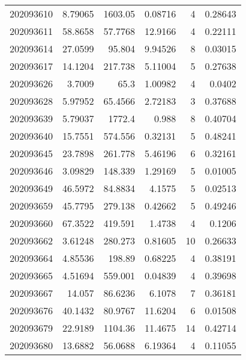 \begin{tabular}{rrrrrr}
 202093610 &          8.79065 &     1603.05   &            0.08716 &           4 & 0.28643 \\
 202093611 &         58.8658  &       57.7768 &           12.9166  &           4 & 0.22111 \\
 202093614 &         27.0599  &       95.804  &            9.94526 &           8 & 0.03015 \\
 202093617 &         14.1204  &      217.738  &            5.11004 &           5 & 0.27638 \\
 202093626 &          3.7009  &       65.3    &            1.00982 &           4 & 0.0402  \\
 202093628 &          5.97952 &       65.4566 &            2.72183 &           3 & 0.37688 \\
 202093639 &          5.79037 &     1772.4    &            0.988   &           8 & 0.40704 \\
 202093640 &         15.7551  &      574.556  &            0.32131 &           5 & 0.48241 \\
 202093645 &         23.7898  &      261.778  &            5.46196 &           6 & 0.32161 \\
 202093646 &          3.09829 &      148.339  &            1.29169 &           5 & 0.01005 \\
 202093649 &         46.5972  &       84.8834 &            4.1575  &           5 & 0.02513 \\
 202093659 &         45.7795  &      279.138  &            0.42662 &           5 & 0.49246 \\
 202093660 &         67.3522  &      419.591  &            1.4738  &           4 & 0.1206  \\
 202093662 &          3.61248 &      280.273  &            0.81605 &          10 & 0.26633 \\
 202093664 &          4.85536 &      198.89   &            0.68225 &           4 & 0.38191 \\
 202093665 &          4.51694 &      559.001  &            0.04839 &           4 & 0.39698 \\
 202093667 &         14.057   &       86.6236 &            6.1078  &           7 & 0.36181 \\
 202093676 &         40.1432  &       80.9767 &           11.6204  &           6 & 0.01508 \\
 202093679 &         22.9189  &     1104.36   &           11.4675  &          14 & 0.42714 \\
 202093680 &         13.6882  &       56.0688 &            6.19364 &           4 & 0.11055 \\

\end{tabular}
